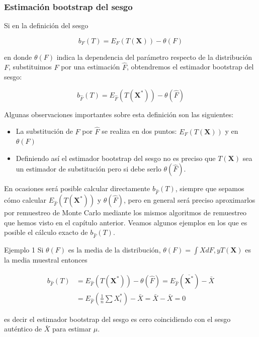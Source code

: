 \documentclass[
]{article}
\providecommand{\tightlist}{%
  \setlength{\itemsep}{0pt}\setlength{\parskip}{0pt}}
\begin{document}
\subsubsection{Estimación bootstrap del sesgo}\label{estimaciuxf3n-bootstrap-del-sesgo}

Si en la definición del sesgo

\[
b_{F}(T)=E_{F}(T(\mathbf{X}))-\theta(F)
\]

en donde \(\theta(F)\) indica la dependencia del parámetro respecto de la distribución \(F\), substituimos \(F\) por una estimación \(\hat{F}\), obtendremos el estimador bootstrap del sesgo:

\[
b_{\hat{F}}(T)=E_{\hat{F}}\left(T\left(\mathbf{X}^{*}\right)\right)-\theta(\hat{F})
\]

Algunas observaciones importantes sobre esta definición son las siguientes:

\begin{itemize}
\tightlist
\item
  La substitución de \(F\) por \(\hat{F}\) se realiza en dos puntos: \(E_{F}(T(\mathbf{X}))\) y en \(\theta(F)\)
\item
  Definiendo así el estimador bootstrap del sesgo no es preciso que \(T(\mathbf{X})\) sea un estimador de substitución pero si debe serlo \(\theta(\hat{F})\).
\end{itemize}

En ocasiones será posible calcular directamente \(b_{\hat{F}}(T)\), siempre que sepamos cómo calcular \(E_{\hat{F}}\left(T\left(\mathbf{X}^{*}\right)\right)\) y \(\theta(\hat{F})\), pero en general será preciso aproximarlos por remuestreo de Monte Carlo mediante los mismos algoritmos de remuestreo que hemos visto en el capítulo anterior. Veamos algunos ejemplos en los que es posible el cálculo exacto de \(b_{\hat{F}}(T)\).

Ejemplo 1 Si \(\theta(F)\) es la media de la distribución, \(\theta(F)=\int X d F, y T(\mathbf{X})\) es la media muestral entonces

\[
\begin{aligned}
b_{\hat{F}}(T) & =E_{\hat{F}}\left(T\left(\mathbf{X}^{*}\right)\right)-\theta(\hat{F})=E_{\hat{F}}\left(\overline{\mathbf{X}^{*}}\right)-\bar{X} \\
& =E_{\hat{F}}\left(\frac{1}{n} \sum X_{i}^{*}\right)-\bar{X}=\bar{X}-\bar{X}=0
\end{aligned}
\]

es decir el estimador bootstrap del sesgo es cero coincidiendo con el sesgo auténtico de \(\bar{X}\) para estimar \(\mu\).
\end{document}
